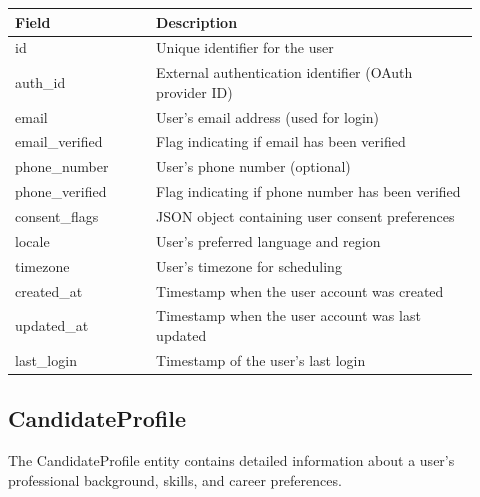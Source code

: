 \documentclass[12pt,a4paper]{report}
\begin{document}
\begin{longtable}{p{0.28\linewidth} p{0.64\linewidth}}
\toprule
\textbf{Field} & \textbf{Description}\\
\midrule
id & Unique identifier for the user\\
auth\_id & External authentication identifier (OAuth provider ID)\\
email & User's email address (used for login)\\
email\_verified & Flag indicating if email has been verified\\
phone\_number & User's phone number (optional)\\
phone\_verified & Flag indicating if phone number has been verified\\
consent\_flags & JSON object containing user consent preferences\\
locale & User's preferred language and region\\
timezone & User's timezone for scheduling\\
created\_at & Timestamp when the user account was created\\
updated\_at & Timestamp when the user account was last updated\\
last\_login & Timestamp of the user's last login\\
\bottomrule
\end{longtable}

\subsection{CandidateProfile}
The CandidateProfile entity contains detailed information about a user's professional background, skills, and career preferences.
\end{document}
